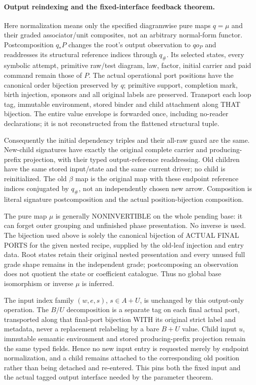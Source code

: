 \documentclass{article}
\begin{document}
\paragraph{Output reindexing and the fixed-interface feedback theorem.}
Here normalization means only the specified diagramwise pure maps $q=\mu$ and their graded associator/unit composites, not an arbitrary normal-form functor. Postcomposition $q_*P$ changes the root's output observation to $q o_P$ and readdresses its structural reference indices through $q_\#$. Its selected states, every symbolic attempt, primitive raw/test diagram, law, factor, initial carrier and paid command remain those of $P$. The actual operational port positions have the canonical order bijection preserved by $q$; primitive support, completion mark, birth injection, sponsors and all original labels are preserved. Transport each loop tag, immutable environment, stored binder and child attachment along THAT bijection. The entire value envelope is forwarded once, including no-reader declarations; it is not reconstructed from the flattened structural tuple.

Consequently the initial dependency triples and their all-raw guard are the same. New-child signatures have exactly the original complete carrier and producing-prefix projection, with their typed output-reference readdressing. Old children have the same stored input/state and the same current driver; no child is reinitialized. The old $\beta$ map is the original map with these endpoint reference indices conjugated by $q_\#$, not an independently chosen new arrow. Composition is literal signature postcomposition and the actual position-bijection composition.

The pure map $\mu$ is generally NONINVERTIBLE on the whole pending base: it can forget outer grouping and unfinished phase presentation. No inverse is used. The bijection used above is solely the canonical bijection of ACTUAL FINAL PORTS for the given nested recipe, supplied by the old-leaf injection and entry data. Root states retain their original nested presentation and every unused full grade shape remains in the independent grade; postcomposing an observation does not quotient the state or coefficient catalogue. Thus no global base isomorphism or inverse $\mu$ is inferred.

The input index family $(w,e,s)$, $s\in A+U$, is unchanged by this output-only operation. The $B/U$ decomposition is a separate tag on each final actual port, transported along that final-port bijection WITH its original strict label and metadata, never a replacement relabeling by a bare $B+U$ value. Child input $u$, immutable semantic environment and stored producing-prefix projection remain the same typed fields. Hence no new input entry is requested merely by endpoint normalization, and a child remains attached to the corresponding old position rather than being detached and re-entered. This pins both the fixed input and the actual tagged output interface needed by the parameter theorem.
\end{document}
